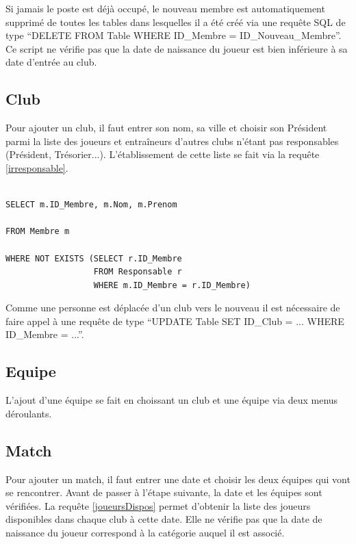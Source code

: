 \documentclass[a4paper»,8pt,french,fleqn]{report}
\begin{document}
Si jamais le poste est déjà occupé, le nouveau membre est automatiquement supprimé de toutes les tables dans lesquelles il a été créé via une requête SQL de type ``DELETE FROM Table WHERE ID\_Membre = ID\_Nouveau\_Membre''. Ce script ne vérifie pas que la date de naissance du joueur est bien inférieure à sa date d'entrée au club.

\subsection{Club}
Pour ajouter un club, il faut entrer son nom, sa ville et choisir son Président parmi la liste des joueurs et entraîneurs d'autres clubs n'étant pas responsables (Président, Trésorier...). L'établissement de cette liste se fait via la requête \ref{irresponsable}.

\begin{lstlisting}

SELECT m.ID_Membre, m.Nom, m.Prenom 

FROM Membre m

WHERE NOT EXISTS (SELECT r.ID_Membre 
                  FROM Responsable r 
                  WHERE m.ID_Membre = r.ID_Membre)

\end{lstlisting}  

Comme une personne est déplacée d'un club vers le nouveau il est nécessaire de faire appel à une requête de type ``UPDATE Table SET ID\_Club = ... WHERE ID\_Membre = ...''.

\subsection{Equipe}
L'ajout d'une équipe se fait en choissant un club et une équipe via deux menus déroulants.

\subsection{Match}
Pour ajouter un match, il faut entrer une date et choisir les deux équipes qui vont se rencontrer. Avant de passer à l'étape suivante, la date et les équipes sont vérifiées. La requête \ref{joueursDispos} permet d'obtenir la liste des joueurs disponibles dans chaque club à cette date. Elle ne vérifie pas que la date de naissance du joueur correspond à la catégorie auquel il est associé.
\end{document}

